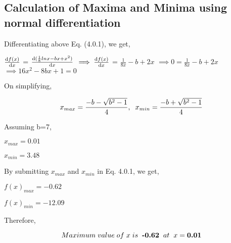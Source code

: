 \documentclass[journal,10pt,twocolumn]{article}
\begin{document}
\subsection{Calculation of Maxima and Minima using normal differentiation}
\begin{flushleft}
\vspace{0.35cm}
Differentiating above Eq. (4.0.1), we get,
\end{flushleft}
\vspace{0.25cm}
\center
$\diff{f(x)}{x}$ = $\diff{(\frac{1}{8}lnx-bx+x^2)}{x}$
\endcenter
\vspace{0.25cm}
\center
$\implies \diff{f(x)}{x}$ = $\frac{1}{8x}-b+2x$
\endcenter
\vspace{0.25cm}
\center
$\implies 0 = \frac{1}{8x}-b+2x$
\endcenter
\vspace{0.25cm}
\center
$\implies 16x^2-8bx+1=0$
\endcenter
\begin{flushleft}
On simplifying,
\end{flushleft}
\begin{equation}
  x_{max}=\frac{-b-\sqrt{b^2-1}}{4}, \hspace{0.2cm} x_{min}=\frac{-b+\sqrt{b^2-1}}{4}
\end{equation}
\begin{flushleft}
\vspace{0.15cm}
Assuming b=7,
\end{flushleft}
\begin{center}
  $x_{max}=0.01$
\end{center}
\begin{center}
\vspace{0.1cm}
 $x_{min}=3.48$
\end{center}
\begin{flushleft}
\vspace{0.1cm}
By submitting $x_{max}$ and $x_{min}$ in Eq. 4.0.1, we get,
\end{flushleft}
\vspace{0.2cm}
\begin{center}
 $f(x)_{max}=-0.62$
\end{center}
\begin{center}
$f(x)_{min}=-12.09$
\end{center}
\begin{flushleft}
Therefore,
\end{flushleft}
\begin{equation}
    Maximum \hspace{0.1cm}value \hspace{0.1cm}of \hspace{0.1cm} x \hspace{0.1cm}is \hspace{0.2cm}\textbf{-0.62} \hspace{0.2cm}at\hspace{0.2cm} x=\textbf{0.01}
\end{equation}
\end{document}
